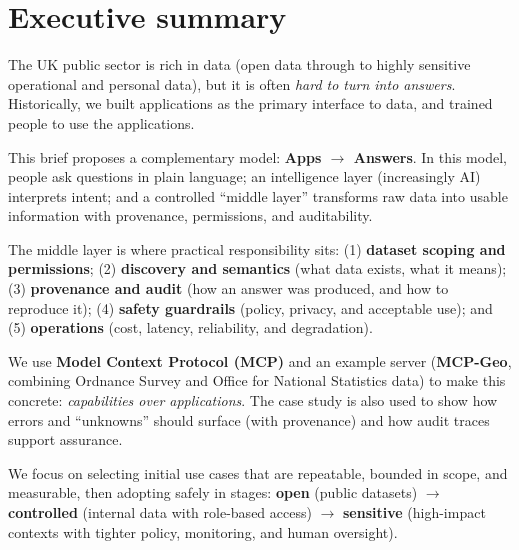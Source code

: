 \section*{Executive summary}

The UK public sector is rich in data (open data through to highly sensitive operational and personal data), but it is often \emph{hard to turn into answers}. \cite{oecd_data_driven_public_sector2019,nao_data_across_gov} Historically, we built applications as the primary interface to data, and trained people to use the applications.

This brief proposes a complementary model: \textbf{Apps $\rightarrow$ Answers}. In this model, people ask questions in plain language; an intelligence layer (increasingly AI) interprets intent; and a controlled ``middle layer'' transforms raw data into usable information with provenance, permissions, and auditability. \cite{mcp_spec_2025_11_25,prov_o,prov_dm}

The middle layer is where practical responsibility sits: (1) \textbf{dataset scoping and permissions}; (2) \textbf{discovery and semantics} (what data exists, what it means); (3) \textbf{provenance and audit} (how an answer was produced, and how to reproduce it); (4) \textbf{safety guardrails} (policy, privacy, and acceptable use); and (5) \textbf{operations} (cost, latency, reliability, and degradation). \cite{ncsc_secure_ai_guidelines,ico_ai_data_protection,data_ai_ethics_framework,five_safes_framework,algorithmic_transparency_recording_standard}

We use \textbf{Model Context Protocol (MCP)} and an example server (\textbf{MCP-Geo}, combining Ordnance Survey and Office for National Statistics data) to make this concrete: \emph{capabilities over applications}. The case study is also used to show how errors and ``unknowns'' should surface (with provenance) and how audit traces support assurance. \cite{mcp_spec_2025_11_25,prov_o,algorithmic_transparency_recording_standard,artefact_claude_stopped_after_ngd_features_2026_02_18,artefact_codex_trace_jsonl_2026_02_18}

We focus on selecting initial use cases that are repeatable, bounded in scope, and measurable, then adopting safely in stages: \textbf{open} (public datasets) $\rightarrow$ \textbf{controlled} (internal data with role-based access) $\rightarrow$ \textbf{sensitive} (high-impact contexts with tighter policy, monitoring, and human oversight). \cite{five_safes_framework,ico_ai_data_protection,ncsc_secure_ai_guidelines}

